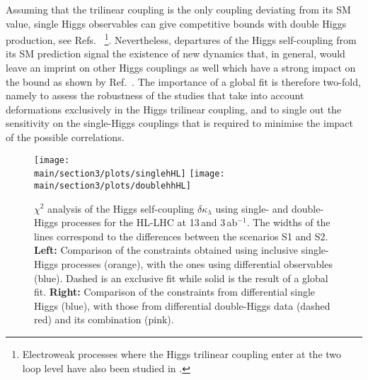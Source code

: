 Assuming that the trilinear coupling is the only coupling deviating from its SM value, single Higgs observables can give competitive bounds with double Higgs production, see Refs.~\cite{Gorbahn:2016uoy,Degrassi:2016wml,Bizon:2016wgr,Degrassi:2017ucl,Maltoni:2017ims} \footnote{Electroweak processes where the Higgs trilinear coupling enter at the two loop level have also been studied in \cite{Kribs:2017znd}.}. Nevertheless, departures of the Higgs self-coupling from its SM prediction signal the existence of new dynamics that, in general, would leave an imprint on other Higgs couplings as well which have a strong impact on the bound as shown by Ref.~\cite{DiVita:2017eyz}. The importance of a global fit is therefore two-fold, namely to assess the robustness of the studies that take into account deformations exclusively in the Higgs trilinear coupling, and to single out the sensitivity on the single-Higgs couplings that is required to minimise the impact of the possible correlations.
\medskip

\begin{figure}
	\centering
	\texttt{[image: \\main/section3/plots/singlehHL]}\hfill
	\texttt{[image: \\main/section3/plots/doublehhHL]}
	\caption{$\chi^2$ analysis of the Higgs self-coupling $\delta \kappa_\lambda$ using single- and double-Higgs processes for the HL-LHC at 13\,\UTeV and 3\,ab$^{-1}$. The widths of the lines correspond to the differences between the scenarios S1 and S2. \textbf{Left:} Comparison of the constraints obtained using inclusive single-Higgs processes (orange), with the ones using differential observables (blue). Dashed is an exclusive fit while solid is the result of a global fit. \textbf{Right:} Comparison of the constraints from differential single Higgs (blue), with those from differential double-Higgs data (dashed red) and its combination (pink).}
	\label{fig:hllhcchi2}
\end{figure}

